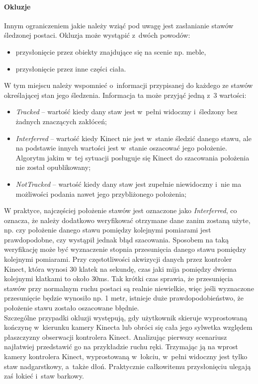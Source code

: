 \paragraph*{Okluzje}
Innym ograniczeniem jakie należy wziąć pod uwagę jest zasłanianie stawów śledzonej postaci. Okluzja może wystąpić z~dwóch powodów:
\begin{itemize}
	\item przysłonięcie przez obiekty znajdujące się na scenie np. meble,
	\item przysłonięcie przez inne części ciała.
\end{itemize}
																																			
W tym miejscu należy wspomnieć o~informacji przypisanej do każdego ze stawów określającej stan jego śledzenia. Informacja ta może przyjąć jedną z~3 wartości:
\begin{itemize}
	\item \emph{Tracked} -- wartość kiedy dany staw jest w~pełni widoczny i~śledzony bez żadnych znaczących zakłóceń;
	\item \emph{Interferred} -- wartość kiedy Kinect nie jest w~stanie śledzić danego stawu, ale na podstawie innych wartości jest w~stanie oszacować jego położenie. Algorytm jakim w~tej sytuacji posługuje się Kinect do szacowania położenia nie został opublikowany;
	\item \emph{NotTracked} -- wartość kiedy dany staw jest zupełnie niewidoczny i~nie ma możliwości podania nawet jego przybliżonego położenia;
\end{itemize}
																																			
W praktyce, najczęściej położenie stawów jest oznaczone jako \emph{Interferred}, co oznacza, że należy dodatkowo weryfikować otrzymane dane zanim zostaną użyte, np. czy położenie danego stawu pomiędzy kolejnymi pomiarami jest prawdopodobne, czy wystąpił jednak błąd szacowania. Sposobem na taką weryfikację może być wyznaczenie stopnia przesunięcia danego stawu pomiędzy kolejnymi pomiarami. Przy częstotliwości akwizycji danych przez kontroler Kinect, która wynosi 30 klatek na sekundę, czas jaki mija pomiędzy dwiema kolejnymi klatkami to około 30ms. Tak krótki czas sprawia, że przesunięcia stawów przy normalnym ruchu postaci są realnie niewielkie, więc jeśli wyznaczone przesunięcie będzie wynosiło np. 1 metr, istnieje duże prawdopodobieństwo, że położenie stawu zostało oszacowane błędnie.\\
																																			
Szczególne przypadki okluzji występują, gdy użytkownik skieruje wyprostowaną kończynę w~kierunku kamery Kinecta lub obróci się cała jego sylwetka względem płaszczyzny obserwacji kontrolera Kinect. Analizując pierwszy scenariusz najłatwiej przedstawić go na przykładzie ruchu ręki. Trzymając ją na wprost kamery kontrolera Kinect, wyprostowaną w~łokciu, w~pełni widoczny jest tylko staw nadgarstkowy, a~także dłoń. Praktycznie całkowitemu przysłonięciu ulegają zaś łokieć i~staw barkowy. 
																																			
